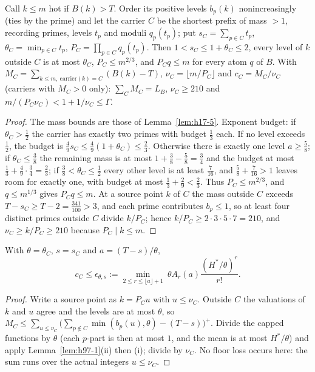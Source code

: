 \begin{lemma}\label{lem:h97-4}
Call $k\le m$ hot if $B(k)>T$. Order its positive levels $b_p(k)$ nonincreasingly (ties by the prime) and let the
carrier $C$ be the shortest prefix of mass $>1$, recording primes, levels $t_p$ and moduli $q_p(t_p)$; put
$s_C=\sum_{p\in C}t_p$, $\theta_C=\min_{p\in C}t_p$, $P_C=\prod_{p\in C}q_p(t_p)$. Then $1<s_C\le1+\theta_C\le2$,
every level of $k$ outside $C$ is at most $\theta_C$, $P_C\le m^{2/3}$, and $P_Cq\le m$ for every atom $q$ of $B$.
With $M_C=\sum_{k\le m,\ \mathrm{carrier}(k)=C}(B(k)-T)$, $\nu_C=\lfloor m/P_C\rfloor$ and $c_C=M_C/\nu_C$ (carriers
with $M_C>0$ only): $\sum_CM_C=L_B$, $\nu_C\ge210$ and $m/(P_C\nu_C)<1+1/\nu_C\le\Gamma$.
\end{lemma}
\begin{proof}
The mass bounds are those of Lemma~\ref{lem:h17-5}. Exponent budget: if $\theta_C>\tfrac12$ the carrier has exactly
two primes with budget $\tfrac13$ each. If no level exceeds $\tfrac12$, the budget is
$\tfrac49s_C\le\tfrac49(1+\theta_C)\le\tfrac23$. Otherwise there is exactly one level $a\ge\tfrac58$; if
$\theta_C\le\tfrac38$ the remaining mass is at most $1+\tfrac38-\tfrac58=\tfrac34$ and the budget at most
$\tfrac13+\tfrac49\cdot\tfrac34=\tfrac23$; if $\tfrac38<\theta_C\le\tfrac12$ every other level is at least
$\tfrac7{16}$, and $\tfrac58+\tfrac7{16}>1$ leaves room for exactly one, with budget at most
$\tfrac13+\tfrac29<\tfrac23$. Thus $P_C\le m^{2/3}$, and $q\le m^{1/3}$ gives $P_Cq\le m$. At a source point $k$ of
$C$ the mass outside $C$ exceeds $T-s_C\ge T-2=\tfrac{341}{100}>3$, and each prime contributes $b_p\le1$, so at least
four distinct primes outside $C$ divide $k/P_C$; hence $k/P_C\ge2\cdot3\cdot5\cdot7=210$, and
$\nu_C\ge k/P_C\ge210$ because $P_C\mid k\le m$.
\end{proof}

\begin{lemma}\label{lem:h97-5}
With $\theta=\theta_C$, $s=s_C$ and $a=(T-s)/\theta$,
\[
c_C\le\epsilon_{\theta,s}:=\min_{2\le r\le\lfloor a\rfloor+1}\ \theta A_r(a)\frac{(H^*/\theta)^r}{r!} .
\]
\end{lemma}
\begin{proof}
Write a source point as $k=P_Cu$ with $u\le\nu_C$. Outside $C$ the valuations of $k$ and $u$ agree and the levels
are at most $\theta$, so $M_C\le\sum_{u\le\nu_C}\bigl(\sum_{p\notin C}\min(b_p(u),\theta)-(T-s)\bigr)^+$. Divide the
capped functions by $\theta$ (each $p$-part is then at most $1$, and the mean is at most $H^*/\theta$) and apply
Lemma~\ref{lem:h97-1}(ii) then (i); divide by $\nu_C$. No floor loss occurs here: the sum runs over the actual integers
$u\le\nu_C$.
\end{proof}

